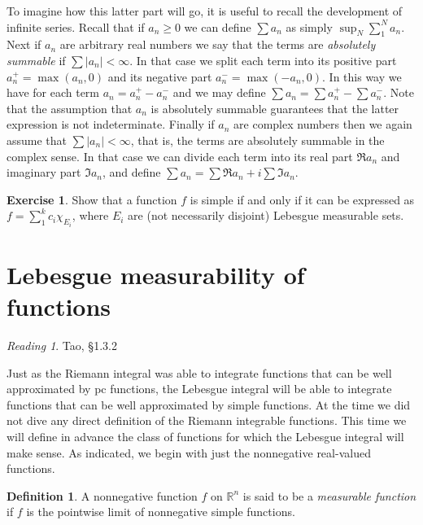 \documentclass[11pt,oneside]{amsbook}
\newcommand{\RR}{{\mathbb R}}
\theoremstyle{definition}
\newtheorem{exerc}{Exercise}[section]
\theoremstyle{plain}
\theoremstyle{definition}
\newtheorem{defn}[thm]{Definition}
\theoremstyle{remark}
\newtheorem*{reading}{Reading}
\numberwithin{equation}{section}
\numberwithin{figure}{section}
\begin{document}
To imagine how this latter part will go, it is useful to recall the development of infinite series. Recall that if $a_n\geq0$ we can define $\sum a_n$ as simply $\sup_N\sum_1^Na_n$. Next if $a_n$ are arbitrary real numbers we say that the terms are \emph{absolutely summable} if $\sum|a_n|<\infty$. In that case we split each term into its positive part $a_n^+=\max(a_n,0)$ and its negative part $a_n^-=\max(-a_n,0)$. In this way we have for each term $a_n=a_n^+-a_n^-$ and we may define $\sum a_n=\sum a_n^+-\sum a_n^-$. Note that the assumption that $a_n$ is absolutely summable guarantees that the latter expression is not indeterminate. Finally if $a_n$ are complex numbers then we again assume that $\sum|a_n|<\infty$, that is, the terms are absolutely summable in the complex sense. In that case we can divide each term into its real part $\Re a_n$ and imaginary part $\Im a_n$, and define $\sum a_n=\sum\Re a_n+i\sum\Im a_n$.


\begin{exerc}
  Show that a function $f$ is simple if and only if it can be expressed as $f=\sum_1^kc_i\chi_{E_i}$, where $E_i$ are (not necessarily disjoint) Lebesgue measurable sets.
\end{exerc}

\newpage
\section{Lebesgue measurability of functions}

\begin{reading}
  Tao, \S 1.3.2
\end{reading}

Just as the Riemann integral was able to integrate functions that can be well approximated by pc functions, the Lebesgue integral will be able to integrate functions that can be well approximated by simple functions. At the time we did not dive any direct definition of the Riemann integrable functions. This time we will define in advance the class of functions for which the Lebesgue integral will make sense. As indicated, we begin with just the nonnegative real-valued functions.

\begin{defn}
  A nonnegative function $f$ on $\RR^n$ is said to be a \emph{measurable function} if $f$ is the pointwise limit of nonnegative simple functions.
\end{defn}
\end{document}

